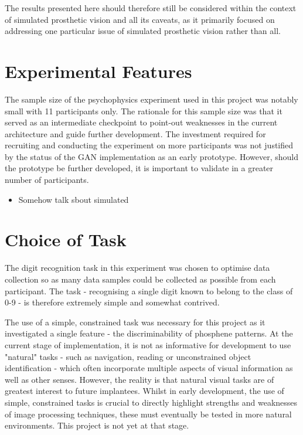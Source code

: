 \documentclass[a4paper,11pt,openany]{book}
\begin{document}
The results presented here should therefore still be considered within the context of simulated prosthetic vision and all its caveats, as it primarily focused on addressing one particular issue of simulated prosthetic vision rather than all.

\section*{Experimental Features}
\label{sec:org69d5c00}

The sample size of the psychophysics experiment used in this project was notably small with 11 participants only.
The rationale for this sample size was that it served as an intermediate checkpoint to point-out weaknesses in the current architecture and guide further development.
The investment required for recruiting and conducting the experiment on more participants was not justified by the status of the GAN implementation as an early prototype.
However, should the prototype be further developed, it is important to validate in a greater number of participants.

\begin{itemize}
\item Somehow talk sbout simulated
\end{itemize}

\section*{Choice of Task}
\label{sec:org5f8d097}

The digit recognition task in this experiment was chosen to optimise data collection so as many data samples could be collected as possible from each participant.
The task - recognising a single digit known to belong to the class of 0-9 - is therefore extremely simple and somewhat contrived.

The use of a simple, constrained task was necessary for this project as it investigated a single feature - the discriminability of phosphene patterns.
At the current stage of implementation, it is not as informative for development to use "natural" tasks - such as navigation, reading or unconstrained object identification - which often incorporate multiple aspects of visual information as well as other senses.
However, the reality is that natural visual tasks are of greatest interest to future implantees.
Whilst in early development, the use of simple, constrained tasks is crucial to directly highlight strengths and weaknesses of image processing techniques, these must eventually be tested in more natural environments.
This project is not yet at that stage.
\end{document}
